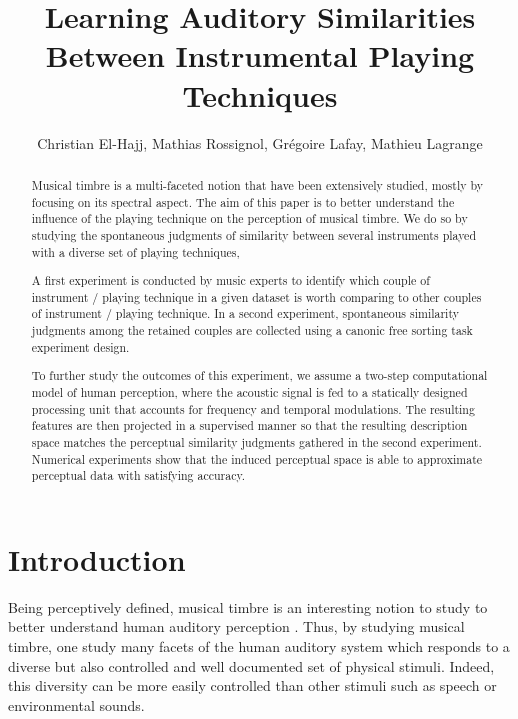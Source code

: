\documentclass{article}
\title{Learning Auditory Similarities Between Instrumental Playing Techniques}
\author{
Christian El-Hajj,
Mathias Rossignol,
Gr\'egoire Lafay,
Mathieu Lagrange}
\begin{document}
\maketitle




\begin{abstract}

Musical timbre is a multi-faceted notion that have been extensively studied,
mostly by focusing on its spectral aspect.
The aim of this paper is to better understand the influence
of the playing technique on the perception of musical timbre.
We do so by studying the spontaneous judgments of similarity between several
instruments played with a diverse set of playing techniques,

A first experiment is conducted by music experts to identify
which couple of instrument / playing technique in a given dataset
is worth comparing to other couples of instrument / playing technique.
In a second experiment, spontaneous similarity
judgments among the retained couples are collected
using a canonic free sorting task experiment design.

To further study the outcomes of this experiment, we assume a
two-step computational model of human perception, where the acoustic signal
is fed to a statically designed processing unit that accounts for frequency
and temporal modulations.
The resulting features are then projected in a supervised manner so that
the resulting description space matches the perceptual similarity judgments
gathered in the second experiment.
Numerical experiments show that the induced perceptual space
is able to approximate perceptual data with satisfying accuracy.

\end{abstract}


\section{Introduction}\label{sec:introduction}

Being perceptively defined, musical timbre is an interesting notion to study to better understand human auditory perception \cite{grey1977multidimensional}. Thus, by studying musical timbre, one study many facets of the human auditory system which responds to a diverse but also controlled and well documented set of physical stimuli. Indeed, this diversity can be more easily controlled than other stimuli such as speech or environmental sounds.
\end{document}
